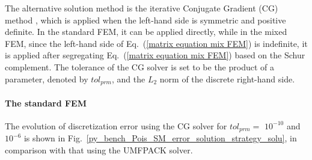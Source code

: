 \documentclass[review,3p]{elsarticle}
\begin{document}
The alternative solution method is the iterative Conjugate Gradient (CG) method \cite{ginsburg1963cg}, which is applied when the left-hand side is symmetric and positive definite.
In the standard FEM, it can be applied directly, while in the mixed FEM, since the left-hand side of Eq.~(\ref{matrix equation mix FEM}) is indefinite, it is applied after segregating Eq.~(\ref{matrix equation mix FEM}) based on the Schur complement.
The tolerance of the CG solver is set to be the product of a parameter, denoted by $tol_{prm}$, and the $L_2$ norm of the discrete right-hand side.

\paragraph{The standard FEM}

The evolution of discretization error using the CG solver for $tol_{prm}=$ $10^{-10}$ and $10^{-6}$ is shown in Fig.~\ref{py_bench_Pois_SM_error_solution_strategy_solu}, in comparison with that using the UMFPACK solver.
\end{document}
